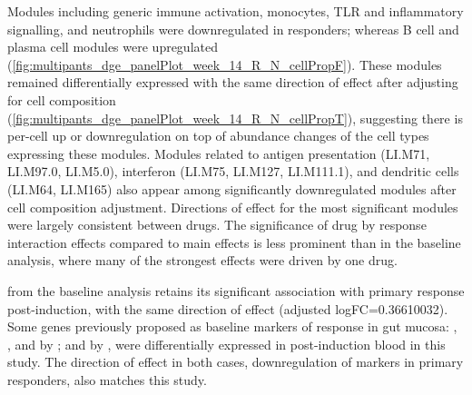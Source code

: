 Modules including generic immune activation, monocytes, TLR and inflammatory signalling, and neutrophils were downregulated in responders; 
whereas B cell and plasma cell modules were upregulated (\autoref{fig:multipants_dge_panelPlot_week_14_R_N_cellPropF}).
These modules remained differentially expressed with the same direction of effect after adjusting for cell composition (\autoref{fig:multipants_dge_panelPlot_week_14_R_N_cellPropT}), 
suggesting there is per-cell up or downregulation on top of abundance changes of the cell types expressing these modules.
Modules related to antigen presentation (LI.M71, LI.M97.0, LI.M5.0),
interferon (LI.M75, LI.M127, LI.M111.1),
and dendritic cells (LI.M64, LI.M165)
also appear among significantly downregulated modules after cell composition adjustment.
Directions of effect for the most significant modules were largely consistent between drugs.
The significance of drug by response interaction effects compared to main effects is less prominent 
than in the baseline analysis, where many of the strongest effects were driven by one drug.

 from the baseline analysis retains its significant association with primary response post-induction, 
with the same direction of effect (adjusted logFC=\num{0.36610032}).
Some genes previously proposed as baseline markers of response in gut mucosa: , ,  and  by \autocite{arijs2010PredictiveValueEpithelial}; and  by \autocite{west2017OncostatinDrivesIntestinal},
were differentially expressed in post-induction blood in this study.
The direction of effect in both cases, downregulation of markers in primary responders, also matches this study.

